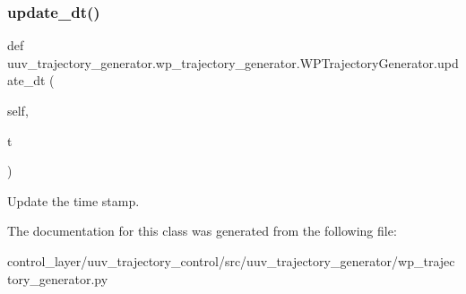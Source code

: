 \subsubsection{\texorpdfstring{update\+\_\+dt()}{update\_dt()}}
{\footnotesize\ttfamily def uuv\+\_\+trajectory\+\_\+generator.\+wp\+\_\+trajectory\+\_\+generator.\+W\+P\+Trajectory\+Generator.\+update\+\_\+dt (\begin{DoxyParamCaption}\item[{}]{self,  }\item[{}]{t }\end{DoxyParamCaption})}

\begin{DoxyVerb}Update the time stamp.\end{DoxyVerb}
 

The documentation for this class was generated from the following file\+:\begin{DoxyCompactItemize}
\item 
control\+\_\+layer/uuv\+\_\+trajectory\+\_\+control/src/uuv\+\_\+trajectory\+\_\+generator/wp\+\_\+trajectory\+\_\+generator.\+py\end{DoxyCompactItemize}
